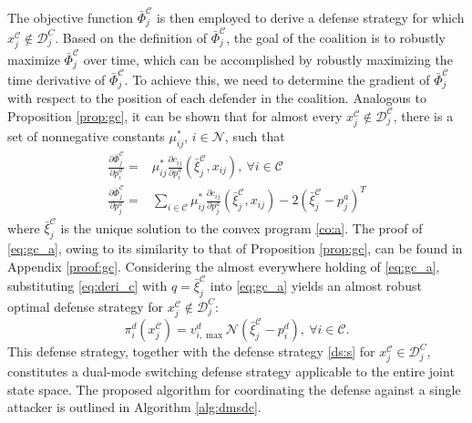 \documentclass[journal]{IEEEtran}
\newcommand{\n}{\mathscr{N}}
\newcommand{\D}{\mathcal{D}}
\newcommand{\N}{\mathcal{N}}
\newcommand{\C}{\mathcal{C}}
\newcommand{\1}{\mathbf{1}}
\begin{document}
The objective function $\bar{\Phi}^\C_j$ is then employed to derive a defense strategy for which $x^{\C}_j\notin \D^C_j$. Based on the definition of $\bar{\Phi}^\C_j$, the goal of the coalition is to robustly maximize $\bar{\Phi}^\C_j$ over time, which can be accomplished by robustly maximizing the time derivative of $\bar{\Phi}^\C_j$. To achieve this, we need to determine the gradient of $\bar{\Phi}^\C_j$ with respect to the position of each defender in the coalition. Analogous to Proposition \ref{prop:gc}, it can be shown that for almost every $x^\C_j\notin \D^\C_j$, there is a set of nonnegative constants $\mu^*_{ij}$, $i\in \N$, such that
\begin{equation}\label{eq:gc_a}
	\begin{split}
	    \frac{\partial \bar{\Phi}^\C_j}{\partial p^d_i}=&\mu^*_{ij}\frac{\partial c_{ij}}{\partial p^d_i}(\bar{\xi}^\C_j,x_{ij}),~\forall i\in \C\\
	    \frac{\partial \bar{\Phi}^\C_j}{\partial p^a_j}=&\sum_{i\in \C}\mu^*_{ij}\frac{\partial c_{ij}}{\partial p^a_j}(\bar{\xi}^\C_j,x_{ij})-2(\bar{\xi}^\C_j-p^a_j)^T
	\end{split}
\end{equation}
where $\bar{\xi}^\C_j$ is the unique solution to the convex program \eqref{co:a}. The proof of \eqref{eq:gc_a}, owing to its similarity to that of Proposition \ref{prop:gc}, can be found in Appendix \ref{proof:gc}. Considering the almost everywhere holding of \eqref{eq:gc_a}, substituting \eqref{eq:deri_c} with $q=\bar{\xi}^\C_j$ into \eqref{eq:gc_a} yields an almost robust optimal defense strategy for $x^{\C}_j\notin \D^C_j$:
\begin{equation}\label{ds_}
    \pi^d_i(x^\C_j)=v^d_{i,\max}\n(\bar{\xi}^\C_j-p^d_i),~\forall i\in \C.
\end{equation}
This defense strategy, together with the defense strategy \eqref{ds:s} for $x^{\C}_j\in \D^C_j$, constitutes a dual-mode switching defense strategy applicable to the entire joint state space. The proposed algorithm for coordinating the defense against a single attacker is outlined in Algorithm \ref{alg:dmsdc}.
\end{document}
